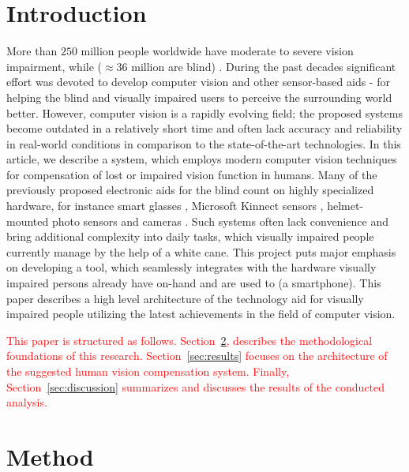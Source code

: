 \documentclass[10pt,conference,compsocconf]{IEEEtran}
\begin{document}
\section{Introduction}
\label{sec:introduction}
More than $250$ million people worldwide have moderate to severe vision impairment, while ($\approx 36$ million are blind) \cite{Bourne}. During the past decades significant effort was devoted to develop computer vision and other sensor-based aids \cite{Caraiman}-\cite{Zientara} for helping the blind and visually impaired users to perceive the surrounding world better. However, computer vision is a rapidly evolving field; the proposed systems become outdated in a relatively short time and often lack accuracy and reliability in real-world conditions in comparison to the state-of-the-art technologies. In this article, we describe a system, which employs modern computer vision techniques for compensation of lost or impaired vision function in humans. Many of the previously proposed electronic aids for the blind count on highly specialized hardware, for instance smart glasses \cite{Zientara}, Microsoft Kinnect sensors \cite{Owayjan}, helmet-mounted photo sensors and cameras \cite{Dunai}. Such systems often lack convenience and bring additional complexity into daily tasks, which visually impaired people currently manage by the help of a white cane. This project puts major emphasis on developing a tool, which seamlessly integrates with the hardware visually impaired persons already have on-hand and are used to (a smartphone). This paper describes a high level architecture of the technology aid for visually impaired people utilizing the latest achievements in the field of computer vision. 

\textcolor{red}{This paper is structured as follows. Section~\ref{sec:method}, describes the methodological foundations of this research. Section~\ref{sec:results} focuses on the architecture of the suggested human vision compensation system. Finally, Section~\ref{sec:discussion} summarizes and discusses the results of the conducted analysis.}


\section{Method}
\label{sec:method}
\end{document}
